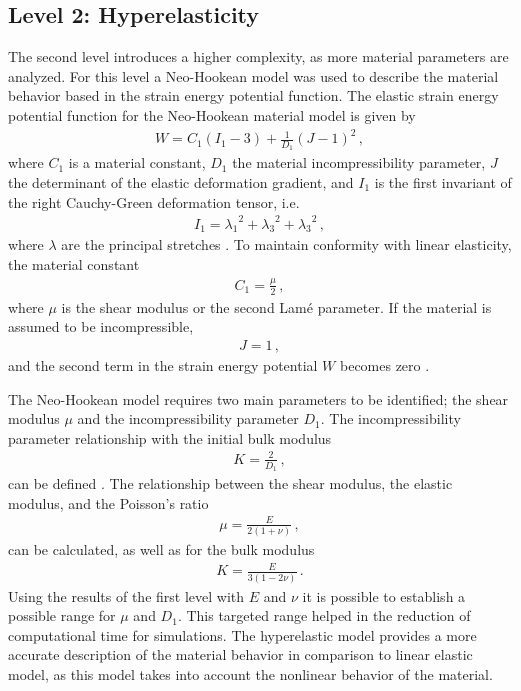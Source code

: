 \subsection{Level 2: Hyperelasticity}
The second level introduces a higher complexity, as more material parameters are analyzed. For this level a 
Neo-Hookean model was used to describe the material behavior based in the strain energy potential function.
The elastic strain energy potential function for the Neo-Hookean material model is given by
\begin{align}
            W = C_1 (I_1 - 3) + \frac{1}{D_1} (J-1)^2 \, ,
\end{align}
where $C_1$ is a material constant, $D_1$ the material incompressibility parameter, $J$ the determinant 
of the elastic deformation gradient, and $I_1$ is the first invariant of the right Cauchy-Green deformation tensor, i.e. 
\begin{align}
    I_1 = {\lambda_1}^2 + {\lambda_3}^2 + {\lambda_3}^2 \, ,
\end{align} 
where $\lambda$ are the principal stretches \cite{Ogden2013}. To maintain conformity with linear elasticity, the material constant 
\begin{align}
    C_1 = \frac{\mu}{2} \, ,
\end{align}
where $\mu$ is the shear modulus or the second Lamé parameter. If the material is assumed to be incompressible,
\begin{align}
    J = 1 \, ,
\end{align} 
and the second term in the strain energy potential $W$ becomes zero \cite{Pence2015}. 

The Neo-Hookean model requires two main parameters to be identified; the shear modulus $\mu$ and 
the incompressibility parameter $D_1$. The incompressibility parameter relationship with the initial bulk modulus
\begin{align}
    K = \frac{2}{D_1} \, ,
\end{align}
 can be defined \cite{Ansys2010}. The relationship between the shear modulus, the elastic modulus, and the Poisson's ratio
\begin{align}
    \mu = \frac{E}{2(1+\nu)} \, ,
\end{align}
can be calculated, as well as for the bulk modulus 
\begin{align}
    K = \frac{E}{3(1-2\nu)} \, .
\end{align}
Using the results of the first level with $E$ and $\nu$ it is possible to establish a possible range for $\mu$ 
and $D_1$. This targeted range helped in the reduction of computational time for simulations.
The hyperelastic model provides a more accurate description of the material behavior in comparison to linear 
elastic model, as this model takes into account the nonlinear behavior of the material. 

